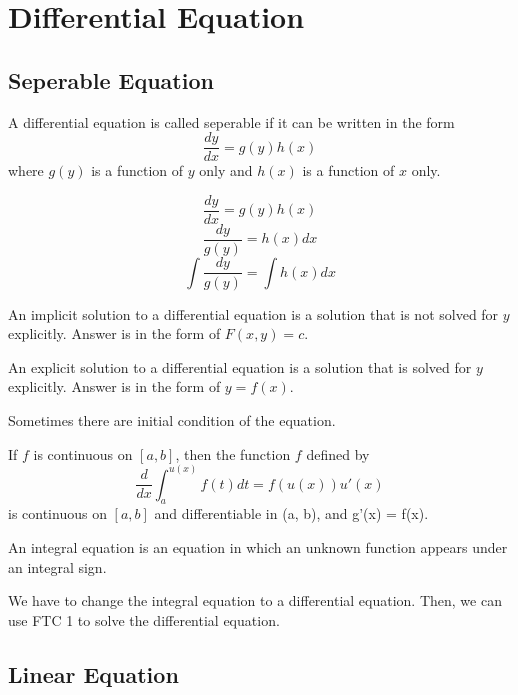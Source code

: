 \chapter{Differential Equation}

\section{Seperable Equation}

\begin{definition}
  A differential equation is called seperable if it can be written in the form
  \[
    \frac{dy}{dx} = g(y)h(x)
  \]
  where \(g(y)\) is a function of \(y\) only and \(h(x)\) is a function of \(x\) only.
\end{definition}

\[
  \frac{dy}{dx} = g(y)h(x)
\]
\[
  \frac{dy}{g(y)} = h(x)dx
\]
\[
  \int \frac{dy}{g(y)} = \int h(x)dx  
\]

\begin{definition}
  An implicit solution to a differential equation is a solution that is not solved for \(y\) explicitly.
  Answer is in the form of \(F(x, y) = c\).
\end{definition}

\begin{definition}
  An explicit solution to a differential equation is a solution that is solved for \(y\) explicitly.
  Answer is in the form of \(y = f(x)\).
\end{definition}

Sometimes there are initial condition of the equation.

\begin{theorem}[FTC 1]
  If \(f\) is continuous on \([a, b]\), then the function \(f\) defined by
  \[
    \frac{d}{dx} \int_{a}^{u(x)} f(t) dt = f(u(x))u'(x)
  \]
  is continuous on \([a, b]\) and differentiable in (a, b), and g'(x) = f(x).
\end{theorem}

\begin{definition}
  An integral equation is an equation in which an unknown function appears under an integral sign.
\end{definition}

We have to change the integral equation to a differential equation. Then, we can use FTC 1 to solve the differential equation.

\section{Linear Equation}


